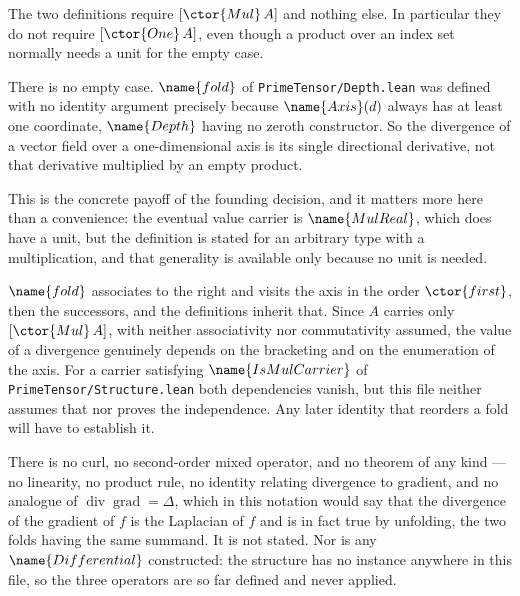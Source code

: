 \begin{remark}
\label{Tensor:Calculus:rem:no-unit}
The two definitions require $[\ctor{Mul}\,A]$ and nothing else.  In particular
they do not require $[\ctor{One}\,A]$, even though a product over an index set
normally needs a unit for the empty case.

There is no empty case.  $\name{fold}$ of \texttt{PrimeTensor/Depth.lean} was
defined with no identity argument precisely because $\name{Axis}(d)$ always has
at least one coordinate, $\name{Depth}$ having no zeroth constructor.  So the
divergence of a vector field over a one-dimensional axis is its single
directional derivative, not that derivative multiplied by an empty product.

This is the concrete payoff of the founding decision, and it matters more here
than a convenience: the eventual value carrier is $\name{MulReal}$, which does
have a unit, but the definition is stated for an arbitrary type with a
multiplication, and that generality is available only because no unit is
needed.
\end{remark}

\begin{remark}
\label{Tensor:Calculus:rem:order}
$\name{fold}$ associates to the right and visits the axis in the order
$\ctor{first}$, then the successors, and the definitions inherit that.  Since
$A$ carries only $[\ctor{Mul}\,A]$, with neither associativity nor
commutativity assumed, the value of a divergence genuinely depends on the
bracketing and on the enumeration of the axis.  For a carrier satisfying
$\name{IsMulCarrier}$ of \texttt{PrimeTensor/Structure.lean} both dependencies
vanish, but this file neither assumes that nor proves the independence.  Any
later identity that reorders a fold will have to establish it.
\end{remark}

\begin{remark}\label{Tensor:Calculus:rem:absent}
There is no curl, no second-order mixed operator, and no theorem of any kind
--- no linearity, no product rule, no identity relating divergence to gradient,
and no analogue of $\operatorname{div}\operatorname{grad} = \Delta$, which in
this notation would say that the divergence of the gradient of $f$ is the
Laplacian of $f$ and is in fact true by unfolding, the two folds having the
same summand.  It is not stated.  Nor is any $\name{Differential}$ constructed:
the structure has no instance anywhere in this file, so the three operators are
so far defined and never applied.
\end{remark}


